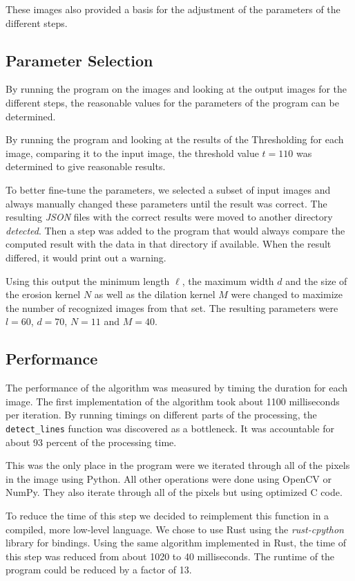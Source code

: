 \documentclass[serif,article,noparskip]{agse-thesis}
\begin{document}
These images also provided a basis for the adjustment of the parameters of the
different steps.

\subsection{Parameter Selection} \label{parameter}

By running the program on the images and looking at the output images for the
different steps, the reasonable values for the parameters of the program can be
determined.

By running the program and looking at the results of the Thresholding for each
image, comparing it to the input image, the threshold value $t = 110$ was
determined to give reasonable results.

To better fine-tune the parameters, we selected a subset of input images and
always manually changed these parameters until the result was correct. The
resulting \textit{JSON} files with the correct results were moved to another
directory \textit{detected}. Then a step was added to the program that would
always compare the computed result with the data in that directory if available.
When the result differed, it would print out a warning.

Using this output the minimum length $\ell$, the maximum width $d$ and the size
of the erosion kernel $N$ as well as the dilation kernel $M$ were changed to
maximize the number of recognized images from that set. The resulting parameters
were $l = 60$, $d = 70$, $N=11$ and $M =40$.


\subsection{Performance} \label{performance}

The performance of the algorithm was measured by timing the duration for each
image. The first implementation of the algorithm took about 1100 milliseconds per
iteration. By running timings on different parts of the processing, the
\texttt{detect\_lines} function was discovered as a bottleneck. It was
accountable for about 93 percent of the processing time.

This was the only place in the program were we iterated through all of the pixels
in the image using Python. All other operations were done using OpenCV or NumPy.
They also iterate through all of the pixels but using optimized C code.

To reduce the time of this step we decided to reimplement this function in a
compiled, more low-level language. We chose to use Rust using the \textit{rust-cpython}
library for bindings. Using the same algorithm implemented in Rust, the time of
this step was reduced from about 1020 to 40 milliseconds. The runtime of the
program could be reduced by a factor of 13.
\end{document}
